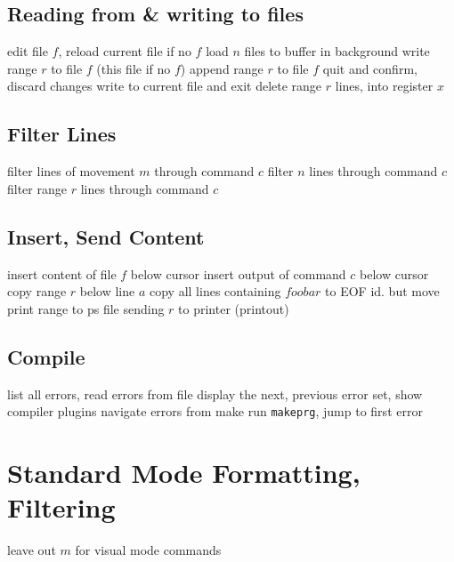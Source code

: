 \subsection{Reading from \& writing to files}	{}
	{edit file $f$, reload current file if no $f$}
	{load $n$ files to buffer in background}
	{write range $r$ to file $f$ (this file if no $f$)}
	{append range $r$ to file $f$}
	{quit and confirm, discard changes}
	{write to current file and exit}
	{delete range $r$ lines, into register $x$}

\subsection{Filter Lines}{}
	{filter lines of movement $m$ through command $c$}
	{filter $n$ lines through command $c$}
	{filter range $r$ lines through command $c$}

\subsection{Insert, Send Content}	{}
	{insert content of file $f$ below cursor}
	{insert output of command $c$ below cursor}
	{copy range $r$ below line $a$}
	{copy all lines containing $foobar$ to EOF}
	{id. but move}
	{print range to ps file}
	{sending $r$ to printer (printout)}

\subsection{Compile}	{}
	{list all errors, read errors from file}
	{display the next, previous error}
	{set, show compiler plugins}
	{navigate errors from make}
	{run {\tt makeprg}, jump to first error}

\section{Standard Mode Formatting, Filtering}	{leave out $m$ for visual mode commands}
